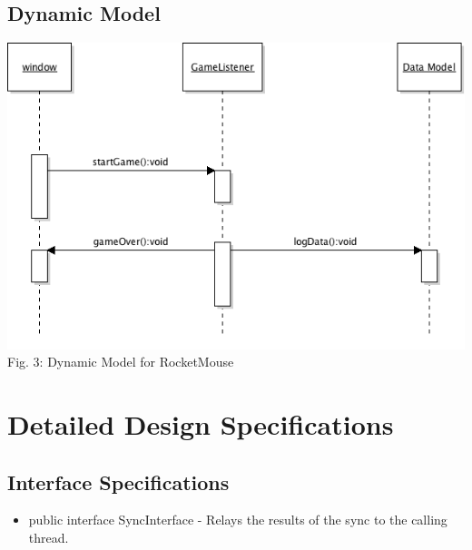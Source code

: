 \documentclass[a4wide]{article}
\begin{document}
\subsection{Dynamic Model}
\includegraphics[width=\textwidth]{images/dynamicModel.png}
Fig. 3: Dynamic Model for RocketMouse
\section{Detailed Design Specifications}

\subsection{Interface Specifications}
\begin{itemize}
\item public interface SyncInterface\newline
- Relays the results of the sync to the calling thread.
\end{itemize}
\end{document}
